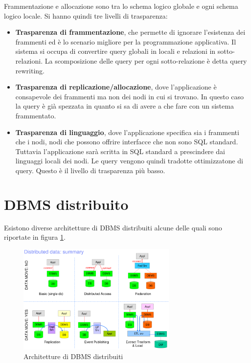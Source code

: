 Frammentazione e allocazione sono tra lo schema logico globale e ogni schema
logico locale. Si hanno quindi tre livelli di trasparenza:
\begin{itemize}
    \item \textbf{Trasparenza di frammentazione}, che permette di ignorare
          l'esistenza dei frammenti ed è lo scenario migliore per la
          programmazione applicativa. Il sistema si occupa di convertire query
          globali in locali e relazioni in sotto-relazioni. La scomposizione
          delle query per ogni sotto-relazione è detta query rewriting.
    \item \textbf{Trasparenza di replicazione/allocazione}, dove l'applicazione
          è consapevole dei frammenti ma non dei nodi in cui si trovano. In questo
          caso la query è già spezzata in quanto si sa di avere a che fare con un
          sistema frammentato.
    \item \textbf{Trasparenza di linguaggio}, dove l'applicazione specifica
          sia i frammenti che i nodi, nodi che possono offrire interfacce che
          non sono SQL standard. Tuttavia l'applicazione sarà scritta in SQL
          standard a prescindere dai linguaggi locali dei nodi. Le query
          vengono quindi tradotte ottimizzatone di query. Questo è il livello
          di trasparenza più basso.
\end{itemize}
\section{DBMS distribuito}
Esistono diverse architetture di DBMS distribuiti alcune delle quali sono
riportate in figura \ref{fig:DBMS_distributed_architecture}.
\begin{figure}
    \centering
    \includegraphics[width=0.7\textwidth]{./img/DBMS/DBMS_distributed_architecture.png}
    \caption{Architetture di DBMS distribuiti}
    \label{fig:DBMS_distributed_architecture}
\end{figure}

